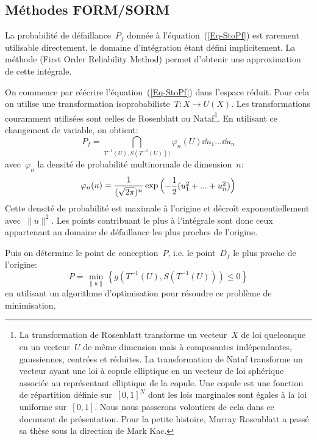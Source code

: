 \medskip
\subsection{Méthodes FORM/SORM}
La probabilité de défaillance~$P_f$ donnée à l'équation~(\ref{Eq-StoPf}) est rarement utilisable directement, le domaine d'intégration étant défini implicitement. La méthode  (First Order Reliability Method) permet d'obtenir une approximation de cette intégrale.

On commence par réécrire l'équation~(\ref{Eq-StoPf}) dans l'espace réduit. Pour cela on utilise une transformation isoprobabiliste~$T : X \rightarrow U(X)$. Les transformations couramment utilisées sont celles de Rosenblatt ou Nataf\footnote{La transformation de Rosenblatt transforme un vecteur~$X$ de loi quelconque en un vecteur~$U$ de même dimension mais à composantes indépendantes, gaussiennes, centrées et réduites. La transformation de Nataf transforme un vecteur ayant une loi à copule elliptique en un vecteur de loi sphérique associée au représentant elliptique de la copule. Une copule est une fonction de répartition définie sur~$[0,1]^N$ dont les lois marginales sont égales à la loi uniforme sur~$[0,1]$. Nous nous passerons volontiers de cela dans ce document de présentation. Pour la petite histoire, Murray Rosenblatt a passé sa thèse sous la direction de Mark Kac.}. En utilisant ce changement de variable, on obtient:
\begin{equation}\label{Eq-StoPfU}
P_f=\dint_{T^{-1}(U),S(T^{-1}(U)))} \varphi_n(U) \dd u_1...\dd u_n
\end{equation}
avec~$\varphi_n$ la densité de probabilité multinormale de dimension~$n$:
\begin{equation}
\varphi_n(u)=\dfrac1{(\sqrt{2\pi})^n}\exp\begin{pmatrix}-\dfrac12(u_1^2+...+u_n^2)\end{pmatrix}
\end{equation}
Cette densité de probabilité est maximale à l'origine et décroît exponentiellement avec~$\|u\|^2$. Les points contribuant le plus à l'intégrale sont donc ceux appartenant au domaine de défaillance les plus proches de l'origine.

Puis on détermine le point de conception~$P$, i.e. le point~$D_f$ le plus proche de l'origine:
\begin{equation}
P = \min_{\|u\|} \left\{g(T^{-1}(U),S(T^{-1}(U)))\le0\right\}
\end{equation}
en utilisant un algorithme d'optimisation pour résoudre ce problème de minimisation.

